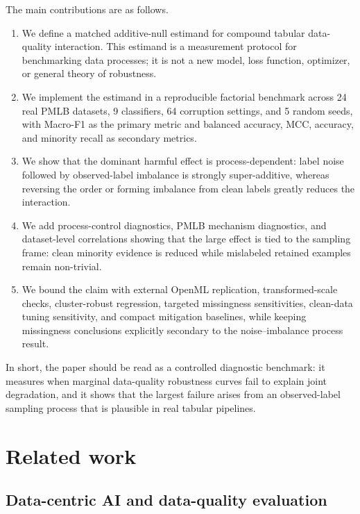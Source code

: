 \documentclass[preprint,12pt,number]{elsarticle}
\begin{document}
The main contributions are as follows.
\begin{enumerate}
    \item We define a matched additive-null estimand for compound tabular data-quality interaction. This estimand is a measurement protocol for benchmarking data processes; it is not a new model, loss function, optimizer, or general theory of robustness.
    \item We implement the estimand in a reproducible factorial benchmark across 24 real PMLB datasets, 9 classifiers, 64 corruption settings, and 5 random seeds, with Macro-F1 as the primary metric and balanced accuracy, MCC, accuracy, and minority recall as secondary metrics.
    \item We show that the dominant harmful effect is process-dependent: label noise followed by observed-label imbalance is strongly super-additive, whereas reversing the order or forming imbalance from clean labels greatly reduces the interaction.
    \item We add process-control diagnostics, PMLB mechanism diagnostics, and dataset-level correlations showing that the large effect is tied to the sampling frame: clean minority evidence is reduced while mislabeled retained examples remain non-trivial.
    \item We bound the claim with external OpenML replication, transformed-scale checks, cluster-robust regression, targeted missingness sensitivities, clean-data tuning sensitivity, and compact mitigation baselines, while keeping missingness conclusions explicitly secondary to the noise--imbalance process result.
\end{enumerate}

In short, the paper should be read as a controlled diagnostic benchmark: it measures when marginal data-quality robustness curves fail to explain joint degradation, and it shows that the largest failure arises from an observed-label sampling process that is plausible in real tabular pipelines.

\section{Related work}

\subsection{Data-centric AI and data-quality evaluation}
\end{document}
